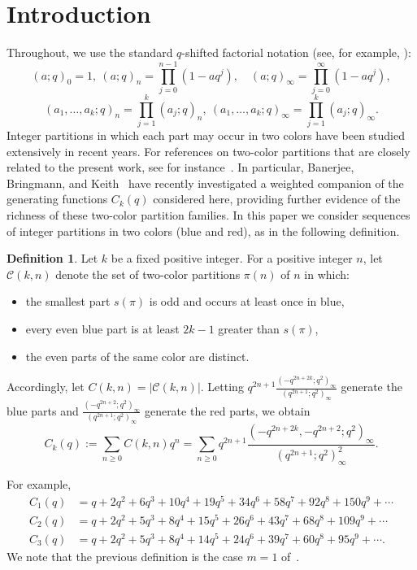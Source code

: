 \documentclass[reqno]{amsart}
\theoremstyle{definition}
\newtheorem{definition}{Definition}
\theoremstyle{plain}
\theoremstyle{remark}
\numberwithin{equation}{section}
\newcommand{\fr}{\frac}
\begin{document}
\section{Introduction}
%
Throughout, we use the standard $q$-shifted factorial notation (see, for example, \cite{Andrews, Gasper-Rahman}):
\[
(a;q)_0 = 1,\  (a;q)_n = \prod_{j=0}^{n-1} (1-aq^j),\quad
(a;q)_{\infty} = \prod_{j=0}^{\infty} (1-aq^j),
\]
\[
(a_1,\ldots,a_k;q)_n = \prod_{j=1}^k (a_j;q)_n,\
(a_1,\ldots,a_k;q)_{\infty} = \prod_{j=1}^k (a_j;q)_{\infty}.
\]
%
Integer partitions in which each part may occur in two colors have been studied
extensively in recent years. For references on two-color partitions that are closely
related to the present work, see for
instance~\cite{Andrews 1987, Andrews 2021, Andrews-Bachraoui evens-1-color, Andrews-Bachraoui positive, Andrews-Kumar, Banerjee-et-al, Chern-Wang}.
In particular,
Banerjee, Bringmann, and Keith~\cite{Banerjee-et-al} have recently investigated a weighted
companion of the generating functions $C_k(q)$ considered here, providing
further evidence of the richness of these two-color partition families.
In this paper we consider sequences of integer partitions in two colors (blue and
red), as in the following definition.
%
\begin{definition}
Let $k$ be a fixed positive integer. For a positive integer $n$, let $\mathcal{C}(k,n)$ denote the set
of two-color partitions $\pi(n)$ of $n$ in which:
\begin{itemize}
\item the smallest part $s(\pi)$ is odd and occurs at least once in blue,
\item every even blue part is at least $2k-1$ greater than $s(\pi)$,
\item the even parts of the same color are distinct.
\end{itemize}
Accordingly, let $C(k,n)=|\mathcal{C}(k,n)|$.
Letting $q^{2n+1}\fr{(-q^{2n+2k};q^2)_\infty}{(q^{2n+1};q^2)_\infty}$ generate the blue parts and
$\fr{(-q^{2n+2};q^2)_\infty}{(q^{2n+1};q^2)_\infty}$ generate the red parts, we obtain
\begin{equation}\label{gen C}
C_{k}(q):= \sum_{n\geq 0}C(k,n) q^n
=\sum_{n\geq 0} q^{2n+1} \fr{(-q^{2n+2k},-q^{2n+2};q^2)_\infty}{(q^{2n+1};q^2)_\infty^2}.
\end{equation}
\end{definition}
%
For example,
\begin{align*}
C_1(q)&=q + 2 q^2 + 6 q^3 + 10 q^4 + 19 q^5 + 34 q^6 + 58 q^7 + 92 q^8 +150 q^9 +\cdots \\
C_2(q)&=q + 2 q^2 + 5 q^3 + 8 q^4 + 15 q^5 + 26 q^6 + 43 q^7 + 68 q^8 + 109 q^9 +\cdots \\
C_3(q)&=q + 2 q^2 + 5 q^3 + 8 q^4 + 14 q^5 + 24 q^6 + 39 q^7 + 60 q^8 + 95 q^9 +\cdots.
\end{align*}
We note that the previous definition is the case $m=1$ of~\cite[Definition~2.1]{Andrews-Bachraoui positive}.
\end{document}
